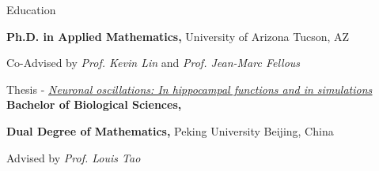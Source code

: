\begin{rubric}{Education}

\entry*[2016 -- 2020]%
	\textbf{Ph.D. in Applied Mathematics,} University of Arizona \hfill Tucson, AZ
	\par Co-Advised by \textit{Prof. Kevin Lin} and \textit{Prof. Jean-Marc Fellous}
	\par Thesis - \href{https://www.proquest.com/docview/2437849732?pq-origsite=gscholar&fromopenview=true}
	{\underline{\textit{Neuronal oscillations: In hippocampal functions and in simulations}}}
%
\entry*[2012 -- 2016]%
	\textbf{Bachelor of Biological Sciences,} 
	\par \textbf{Dual Degree of Mathematics,} Peking University \hfill Beijing, China
	\par Advised by \textit{Prof. Louis Tao}
\end{rubric}